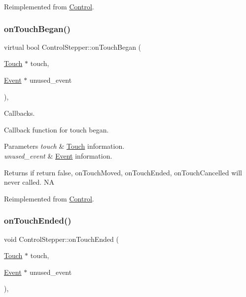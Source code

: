 Reimplemented from \hyperlink{classControl_a0cf2e20cea5b57b263e965be4a19ab52}{Control}.

\mbox{\label{classControlStepper_a7fbb969bb376da49033a5df63f562905}} 
\subsubsection{\texorpdfstring{on\+Touch\+Began()}{onTouchBegan()}\hspace{0.1cm}{\footnotesize\ttfamily [2/2]}}
{\footnotesize\ttfamily virtual bool Control\+Stepper\+::on\+Touch\+Began (\begin{DoxyParamCaption}\item[{\hyperlink{classTouch}{Touch} $\ast$}]{touch,  }\item[{\hyperlink{classEvent}{Event} $\ast$}]{unused\+\_\+event }\end{DoxyParamCaption})\hspace{0.3cm}{\ttfamily [override]}, {\ttfamily [virtual]}}



Callbacks. 

Callback function for touch began.


\begin{DoxyParams}{Parameters}
{\em touch} & \hyperlink{classTouch}{Touch} information. \\
\hline
{\em unused\+\_\+event} & \hyperlink{classEvent}{Event} information. \\
\hline
\end{DoxyParams}
\begin{DoxyReturn}{Returns}
if return false, on\+Touch\+Moved, on\+Touch\+Ended, on\+Touch\+Cancelled will never called.  NA 
\end{DoxyReturn}


Reimplemented from \hyperlink{classControl_a0cf2e20cea5b57b263e965be4a19ab52}{Control}.

\mbox{\label{classControlStepper_a55e6582294a0520d21e397c3a58cf57b}} 
\subsubsection{\texorpdfstring{on\+Touch\+Ended()}{onTouchEnded()}\hspace{0.1cm}{\footnotesize\ttfamily [1/2]}}
{\footnotesize\ttfamily void Control\+Stepper\+::on\+Touch\+Ended (\begin{DoxyParamCaption}\item[{\hyperlink{classTouch}{Touch} $\ast$}]{touch,  }\item[{\hyperlink{classEvent}{Event} $\ast$}]{unused\+\_\+event }\end{DoxyParamCaption})\hspace{0.3cm}{\ttfamily [override]}, {\ttfamily [virtual]}}

